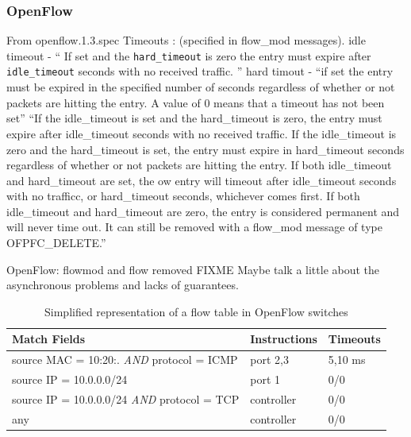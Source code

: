 \documentclass[12pt,openright,twoside]{report}
\begin{document}
\begin{itemize}
\begin{itemize}
\end{itemize}
\subsubsection{OpenFlow}

From openflow.1.3.spec \cite{openflow-spec}
Timeouts : (specified in flow_mod messages). 
idle timeout - `` If set and the \texttt{hard\_timeout} is zero the entry must expire after \texttt{idle\_timeout} seconds with no received traffic. ''
hard timout  - ``if set the entry must be expired in the specified number of seconds regardless of whether or not packets are hitting the entry. A value of 0 means that a timeout has not been set''
``If the idle_timeout is set and the hard_timeout is zero, the entry must expire after idle_timeout
seconds with no received traffic. If the idle\_timeout is zero and the hard_timeout is set, the entry
must expire in hard_timeout seconds regardless of whether or not packets are hitting the entry. If both
idle_timeout and hard\_timeout are set, the 
ow entry will timeout after idle_timeout seconds with
no trafficc, or hard_timeout seconds, whichever comes first. If both idle\_timeout and hard\_timeout are
zero, the entry is considered permanent and will never time out. It can still be removed with a flow_mod
message of type OFPFC\_DELETE.''

OpenFlow: flowmod and flow removed FIXME 
Maybe talk a little about the asynchronous problems and lacks of guarantees. 
\begin{table}[ht]
  \centering
  \begin{tabular}[ht]{lll}
    Match Fields &  Instructions & Timeouts \\ \toprule 
    source MAC = 10:20:. \emph{AND}  protocol = ICMP  & port 2,3 & 5,10 ms \\ 
    source IP = 10.0.0.0/24  & port 1 &  0/0 \\
    source IP = 10.0.0.0/24 \emph{AND} protocol = TCP & controller & 0/0 \\ 
    any & controller & 0/0 \\ \bottomrule 
  \end{tabular}
  \caption{Simplified representation of a flow table in OpenFlow switches }
  
\end{table}



\end{itemize}
\end{document}
